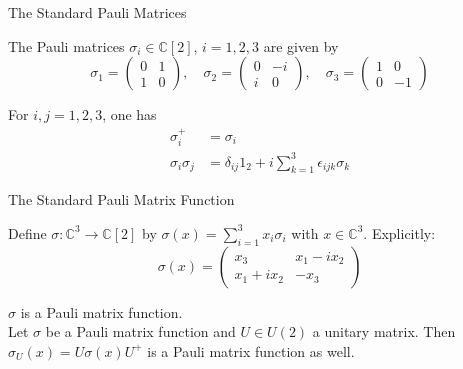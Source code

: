 \begin{frame}{The Standard Pauli Matrices}
    \begin{definition}[9.3.1]
        The Pauli matrices $\sigma_i \in \mathbb{C}[2]$, $i=1,2,3$ are given by
        \[ \sigma_1 = \begin{pmatrix} 0 & 1 \\ 1 & 0 \end{pmatrix}, \quad \sigma_2 = \begin{pmatrix} 0 & -i \\ i & 0 \end{pmatrix}, \quad \sigma_3 = \begin{pmatrix} 1 & 0 \\ 0 & -1 \end{pmatrix} \]
    \end{definition}

    \begin{proposition}[9.3.1]
        For $i, j = 1,2,3$, one has
        \begin{align*}
            \sigma_i^+       & = \sigma_i                                              \\
            \sigma_i\sigma_j & = \delta_{ij}1_2 + i\sum_{k=1}^3 \epsilon_{ijk}\sigma_k
        \end{align*}
    \end{proposition}
\end{frame}

\begin{frame}{The Standard Pauli Matrix Function}
    \begin{definition}[9.3.2]
        Define $\sigma : \mathbb{C}^3 \rightarrow \mathbb{C}[2]$ by $\sigma(x) = \sum_{i=1}^3 x_i\sigma_i$ with $x \in \mathbb{C}^3$. Explicitly:
        \[ \sigma(x) = \begin{pmatrix} x_3 & x_1 - ix_2 \\ x_1 + ix_2 & -x_3 \end{pmatrix} \]
    \end{definition}

    \begin{proposition}[9.3.2 \& 9.3.3]
        $\sigma$ is a Pauli matrix function.\\
        Let $\sigma$ be a Pauli matrix function and $U \in U(2)$ a unitary matrix. Then $\sigma_U(x) = U\sigma(x)U^+$ is a Pauli matrix function as well.
    \end{proposition}
\end{frame}

